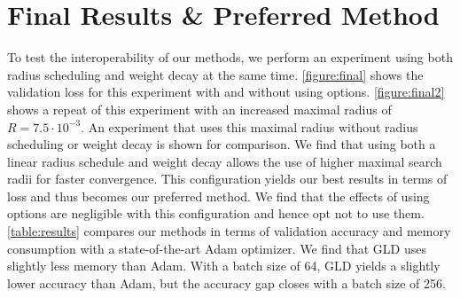 \section{Final Results \& Preferred Method}
To test the interoperability of our methods, we perform 
an experiment using both radius scheduling and 
weight decay at the same time. 
\autoref{figure:final} shows the validation loss 
for this experiment with and without using options.
\autoref{figure:final2} shows a repeat of this experiment
with an increased maximal radius of $R = 7.5 \cdot 10^{-3}$.
An experiment that uses this maximal radius 
without radius scheduling or weight decay is shown
for comparison. We find that using both a linear 
radius schedule and weight decay allows the use 
of higher maximal search radii for faster convergence. 
This configuration yields our best results in terms
of loss and thus becomes our preferred method. We find 
that the effects of using options are 
negligible with this configuration and hence opt 
not to use them.  
\autoref{table:results} compares our methods in terms 
of validation accuracy and memory consumption with 
a state-of-the-art
Adam optimizer. We find that GLD uses slightly less memory 
than Adam. With a batch size of 64, GLD yields a slightly
lower accuracy than Adam, but the accuracy gap closes 
with a batch size of 256. 

